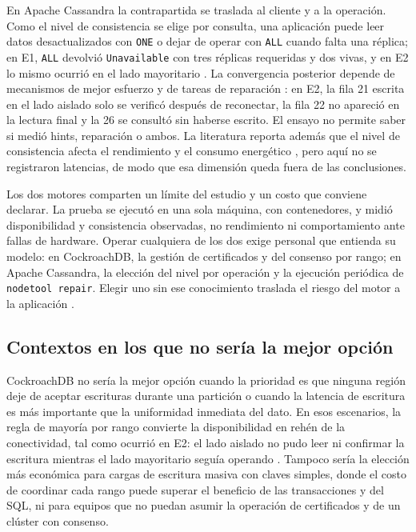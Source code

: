 \documentclass[11pt,a4paper]{article}
\newcommand{\sistemaA}{CockroachDB}      %
\newcommand{\sistemaB}{Apache Cassandra} %
\begin{document}
En \sistemaB{} la contrapartida se traslada al cliente y a la operación. Como el
nivel de consistencia se elige por consulta, una aplicación puede leer datos
desactualizados con \texttt{ONE} o dejar de operar con \texttt{ALL} cuando falta una
réplica; en E1, \texttt{ALL} devolvió \texttt{Unavailable} con tres réplicas
requeridas y dos vivas, y en E2 lo mismo ocurrió en el lado mayoritario
\cite{apacheCassandraGuarantees}. La convergencia posterior depende de mecanismos de
mejor esfuerzo y de tareas de reparación \cite{apacheCassandraRepair}: en E2, la
fila 21 escrita en el lado aislado solo se verificó después de reconectar, la fila
22 no apareció en la lectura final y la 26 se consultó sin haberse escrito. El
ensayo no permite saber si medió hints, reparación o ambos. La literatura reporta
además que el nivel de consistencia afecta el rendimiento y el consumo energético
\cite{ferreira2024consistency,nejati2026cassandra,silva2023lowpower}, pero aquí no
se registraron latencias, de modo que esa dimensión queda fuera de las conclusiones.

Los dos motores comparten un límite del estudio y un costo que conviene declarar.
La prueba se ejecutó en una sola máquina, con contenedores, y midió disponibilidad y
consistencia observadas, no rendimiento ni comportamiento ante fallas de hardware.
Operar cualquiera de los dos exige personal que entienda su modelo: en \sistemaA{},
la gestión de certificados y del consenso por rango; en \sistemaB{}, la elección del
nivel por operación y la ejecución periódica de \texttt{nodetool repair}. Elegir uno
sin ese conocimiento traslada el riesgo del motor a la aplicación
\cite{cockroachlabsArchitecture,apacheCassandraArchitecture}.

\subsection{Contextos en los que no sería la mejor opción}

\sistemaA{} no sería la mejor opción cuando la prioridad es que ninguna región deje
de aceptar escrituras durante una partición o cuando la latencia de escritura es más
importante que la uniformidad inmediata del dato. En esos escenarios, la regla de
mayoría por rango convierte la disponibilidad en rehén de la conectividad, tal como
ocurrió en E2: el lado aislado no pudo leer ni confirmar la escritura mientras el
lado mayoritario seguía operando \cite{cockroachlabsReplication}. Tampoco sería la
elección más económica para cargas de escritura masiva con claves simples, donde el
costo de coordinar cada rango puede superar el beneficio de las transacciones y del
SQL, ni para equipos que no puedan asumir la operación de certificados y de un
clúster con consenso.
\end{document}
